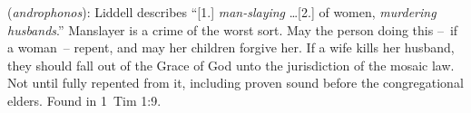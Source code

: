\item[Husband-murderer,]

(\textit{androphonos}):
Liddell describes ``[1.] \emph{man-slaying} \ldots [2.] of women, \emph{murdering husbands}.'' Manslayer is a crime of the worst sort. May the person doing this --~if a woman~-- repent, and may her children forgive her. If a wife kills her husband, they should fall out of the Grace of God unto the jurisdiction of the mosaic law. Not until fully repented from it, including proven sound before the congregational elders.
Found in 1~Tim 1:9.
